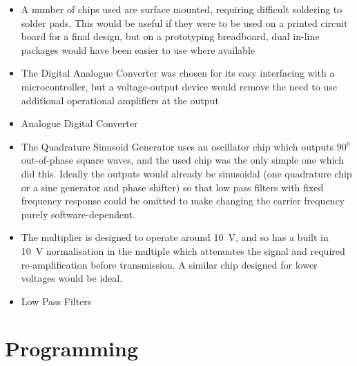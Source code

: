 \documentclass[../main.tex]{subfiles}
\begin{document}
\begin{itemize}
	\item A number of chips used are surface mounted, requiring difficult soldering to solder pads, This would be useful if they were to be used on a printed circuit board for a final design, but on a prototyping breadboard, dual in-line packages would have been easier to use where available
	\item The Digital Analogue Converter was chosen for its easy interfacing with a microcontroller, but a voltage-output device would remove the need to use additional operational amplifiers at the output
	\item Analogue Digital Converter
	\item The Quadrature Sinusoid Generator uses an oscillator chip which outputs $90^o$ out-of-phase square waves, and the used chip was the only simple one which did this. Ideally the outputs would already be sinusoidal (one quadrature chip or a sine generator and phase shifter) so that low pass filters with fixed frequency response could be omitted to make changing the carrier frequency purely software-dependent.
	\item The multiplier is designed to operate around \SI{10}{\volt}, and so has a built in \SI{10}{\volt} normalisation in the multiple which attenuates the signal and required re-amplification before transmission. A similar chip designed for lower voltages would be ideal.
	\item Low Pass Filters
\end{itemize}


\section{Programming}
\end{document}
